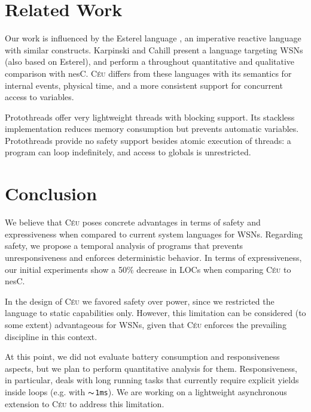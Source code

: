 \documentclass[10pt]{sigplan-proc-varsize-sensys11}
\newcommand{\2}{\;\;}
\newcommand{\5}{\;\;\;\;\;}
\newcommand{\til}{$\thicksim$}
\newcommand{\CEU}{\textsc{C\'{e}u}}
\newcommand{\code}[1] {{\small{\texttt{#1}}}}
\begin{document}
\section{Related Work}

Our work is influenced by the Esterel language \cite{esterel.design}, an 
imperative reactive language with similar constructs.
Karpinski and Cahill \cite{wsn.sol} present a language targeting WSNs (also 
based on Esterel), and perform a throughout quantitative and qualitative 
comparison with nesC.
\CEU{} differs from these languages with its semantics for internal events, 
physical time, and a more consistent support for concurrent access to 
variables.
 
Protothreads \cite{wsn.protothreads} offer very lightweight threads with 
blocking support.
Its stackless implementation reduces memory consumption but prevents automatic 
variables.
Protothreads provide no safety support besides atomic execution of threads:
a program can loop indefinitely, and access to globals is unrestricted.

\section{Conclusion}
\label{sec.conclusion}

We believe that \CEU{} poses concrete advantages in terms of safety and 
expressiveness when compared to current system languages for WSNs.
Regarding safety, we propose a temporal analysis of programs that prevents 
unresponsiveness and enforces deterministic behavior.
In terms of expressiveness, our initial experiments show a 50\% decrease in 
LOCs when comparing \CEU{} to nesC.

In the design of \CEU{} we favored safety over power, since we restricted the 
language to static capabilities only.
However, this limitation can be considered (to some extent) advantageous for 
WSNs, given that \CEU{} enforces the prevailing discipline in this context.

At this point, we did not evaluate battery consumption and responsiveness 
aspects, but we plan to perform quantitative analysis for them.
Responsiveness, in particular, deals with long running tasks that currently 
require explicit yields inside loops (e.g. with \code{\til{}1ms}).
We are working on a lightweight asynchronous extension to \CEU{} to address 
this limitation.

\end{document}
